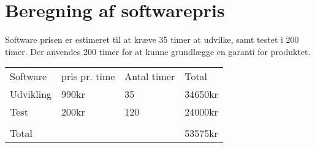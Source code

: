 \section{Beregning af softwarepris}
Software prisen er estimeret til at kræve 35 timer at udvilke, samt testet i 200 timer. Der anvendes 200 timer for at kunne grundlægge en garanti for produktet. 


\begin{tabular}{ |p{3cm}||p{3cm}|p{3cm}|p{3cm}|  }
 \hline
 \rowcolor{lightgray}\multicolumn{4}{|c|}{Pris beregning} \\
 \hline
 Software    & pris pr. time &Antal timer&Total\\
 \hline
 Udvikling   & 990kr    &35&   34650kr\\
 \hline
 Test&   200kr  & 120   &24000kr\\
 \hline
 		&	&	&\\
 \hline
 Total	&	&	&53575kr\\
 \hline 
\end{tabular}
